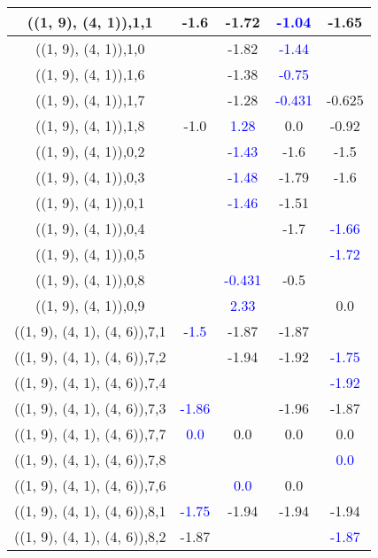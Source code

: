 \documentclass{article}
\begin{document}
\begin{center}
\begin{longtable}{|c|c|c|c|c|}
        	\hline
        	((1, 9), (4, 1)),1,1&-1.6&-1.72& \textcolor{blue}{-1.04}&-1.65\\
        	\hline
        	((1, 9), (4, 1)),1,0&&-1.82& \textcolor{blue}{-1.44}&\\
        	\hline
        	((1, 9), (4, 1)),1,6&&-1.38& \textcolor{blue}{-0.75}&\\
        	\hline
        	((1, 9), (4, 1)),1,7&&-1.28& \textcolor{blue}{-0.431}&-0.625\\
        	\hline
        	((1, 9), (4, 1)),1,8&-1.0& \textcolor{blue}{1.28}&0.0&-0.92\\
        	\hline
        	((1, 9), (4, 1)),0,2&& \textcolor{blue}{-1.43}&-1.6&-1.5\\
        	\hline
        	((1, 9), (4, 1)),0,3&& \textcolor{blue}{-1.48}&-1.79&-1.6\\
        	\hline
        	((1, 9), (4, 1)),0,1&& \textcolor{blue}{-1.46}&-1.51&\\
        	\hline
        	((1, 9), (4, 1)),0,4&&&-1.7& \textcolor{blue}{-1.66}\\
        	\hline
        	((1, 9), (4, 1)),0,5&&&& \textcolor{blue}{-1.72}\\
        	\hline
        	((1, 9), (4, 1)),0,8&& \textcolor{blue}{-0.431}&-0.5&\\
        	\hline
        	((1, 9), (4, 1)),0,9&& \textcolor{blue}{2.33}&&0.0\\
        	\hline
        	((1, 9), (4, 1), (4, 6)),7,1& \textcolor{blue}{-1.5}&-1.87&-1.87&\\
        	\hline
        	((1, 9), (4, 1), (4, 6)),7,2&&-1.94&-1.92& \textcolor{blue}{-1.75}\\
        	\hline
        	((1, 9), (4, 1), (4, 6)),7,4&&&& \textcolor{blue}{-1.92}\\
        	\hline
        	((1, 9), (4, 1), (4, 6)),7,3& \textcolor{blue}{-1.86}&&-1.96&-1.87\\
        	\hline
        	((1, 9), (4, 1), (4, 6)),7,7& \textcolor{blue}{0.0}&0.0&0.0&0.0\\
        	\hline
        	((1, 9), (4, 1), (4, 6)),7,8&&&& \textcolor{blue}{0.0}\\
        	\hline
        	((1, 9), (4, 1), (4, 6)),7,6&& \textcolor{blue}{0.0}&0.0&\\
        	\hline
        	((1, 9), (4, 1), (4, 6)),8,1& \textcolor{blue}{-1.75}&-1.94&-1.94&-1.94\\
        	\hline
        	((1, 9), (4, 1), (4, 6)),8,2&-1.87&&& \textcolor{blue}{-1.87}\\

\end{longtable}
\end{center}
\end{document}
